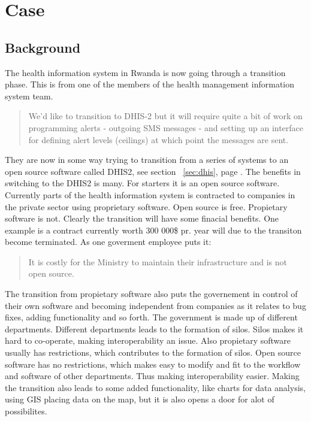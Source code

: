 \chapter{Case}



\section{Background}
The health information system in Rwanda is now going through a transition phase. This is from one of the members of the health management information system team. 
\begin{quote}
We'd like to transition to DHIS-2 but it will require quite a bit of work on programming alerts - outgoing SMS messages - and setting up an interface for defining alert levels (ceilings) at which point the messages are sent.
\end{quote}
They are now in some way trying to transition from a series of systems to an open source software called DHIS2, see section ~\ref{sec:dhis}, page \pageref{sec:dhis}.
The benefits in switching to the DHIS2 is many. For starters it is an open source software. Currently parts of the health information system is contracted to companies in the private sector using proprietary software. 
Open source is free. Propietary software is not. Clearly the transition will have some finacial benefits. 
One example is a contract currently worth 300 000\$ pr. year will due to the transiton become terminated.
As one goverment employee puts it:
\begin{quote}
It is costly for the Ministry to maintain their infrastructure and is not open source.
\end{quote}
The transition from propietary software also puts the governement in control of their own software and becoming independent from companies as it relates to bug fixes, adding functionality and so forth.
The government is made up of different departments. Different departments leads to the formation of silos. Silos makes it hard to co-operate, making interoperability an issue. 
Also propietary software usually has restrictions, which contributes to the formation of silos. 
Open source software has no restrictions, which makes easy to modify and fit to the workflow and software of other departments. 
Thus making interoperability easier. 
Making the transition also leads to some added functionality, like charts for data analysis, using GIS placing data on the map, but it is also opens a door for alot of possibilites. 


